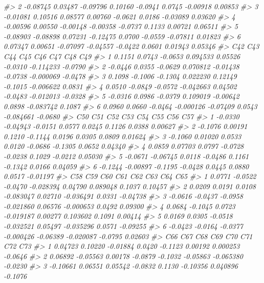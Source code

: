 \documentclass[]{book}
\newenvironment{Shaded}{\begin{snugshade}}{\end{snugshade}}
\newcommand{\CommentTok}[1]{\textcolor[rgb]{0.56,0.35,0.01}{\textit{#1}}}
\begin{document}
\begin{Shaded}
\begin{Highlighting}[]
{{{{{\CommentTok{#> 2 -0.08745  0.03487 -0.09796  0.10160 -0.0941  0.0745 -0.00918  0.00853}
\CommentTok{#> 3 -0.01081  0.10516  0.08577  0.00760 -0.0621  0.0186 -0.03089  0.03620}
\CommentTok{#> 4 -0.00596  0.00550 -0.00148 -0.00358 -0.0737  0.1133  0.00721  0.06511}
\CommentTok{#> 5 -0.08903 -0.08898  0.07231 -0.12475  0.0700 -0.0559 -0.07811  0.01823}
\CommentTok{#> 6  0.07347  0.00651 -0.07097 -0.04557 -0.0422  0.0601  0.01943  0.05346}
\CommentTok{#>       C42     C43     C44       C45      C46     C47       C48     C49}
\CommentTok{#> 1  0.1151  0.0743 -0.0653  0.094533  0.05526 -0.0310 -0.114233 -0.0790}
\CommentTok{#> 2 -0.0446  0.0355 -0.0629  0.070812 -0.01438 -0.0738 -0.000069 -0.0478}
\CommentTok{#> 3  0.1098 -0.1006 -0.1304  0.022230  0.12149 -0.1015 -0.006622  0.0831}
\CommentTok{#> 4  0.0510 -0.0849 -0.0572 -0.042663  0.04502 -0.0483 -0.012013 -0.0328}
\CommentTok{#> 5 -0.0316  0.0986 -0.0379  0.109019 -0.00642  0.0898 -0.083742  0.1087}
\CommentTok{#> 6  0.0960  0.0660 -0.0464 -0.000126 -0.07409  0.0543 -0.084661 -0.0680}
\CommentTok{#>       C50      C51     C52     C53     C54     C55     C56      C57}
\CommentTok{#> 1 -0.0330 -0.04943 -0.0151  0.0577  0.0245  0.1126  0.0388  0.00627}
\CommentTok{#> 2 -0.1076  0.00191  0.1210 -0.1144  0.0196  0.0305  0.0809  0.01624}
\CommentTok{#> 3 -0.1060  0.01020  0.0533  0.0120 -0.0686 -0.1305  0.0652  0.04340}
\CommentTok{#> 4  0.0859  0.07703  0.0797 -0.0728 -0.0238  0.1029 -0.0212  0.05030}
\CommentTok{#> 5 -0.0671 -0.06745  0.0118 -0.0486  0.1161 -0.1342  0.0166  0.04059}
\CommentTok{#> 6 -0.1244 -0.00897 -0.1195 -0.0428  0.0445  0.0880  0.0517 -0.01197}
\CommentTok{#>       C58     C59     C60       C61      C62       C63     C64      C65}
\CommentTok{#> 1  0.0771 -0.0522 -0.0470 -0.028394  0.04790  0.089048  0.1037  0.10457}
\CommentTok{#> 2  0.0209  0.0191  0.0108 -0.083047  0.02710 -0.036491  0.0331 -0.04738}
\CommentTok{#> 3 -0.0616 -0.0437 -0.0958 -0.021860  0.06576 -0.000653  0.0492  0.09300}
\CommentTok{#> 4  0.0684 -0.1045  0.0723 -0.019187  0.00277  0.103602  0.1091  0.00414}
\CommentTok{#> 5  0.0169  0.0305 -0.0518 -0.032521  0.05497 -0.035296  0.0571 -0.09255}
\CommentTok{#> 6 -0.0423 -0.0164 -0.0377 -0.000426 -0.06389 -0.020087 -0.0795  0.02603}
\CommentTok{#>        C66      C67      C68     C69     C70      C71       C72     C73}
\CommentTok{#> 1  0.04723  0.10220 -0.01884  0.0420 -0.1123  0.00192  0.000253 -0.0646}
\CommentTok{#> 2  0.06892 -0.05563  0.00178 -0.0879 -0.1032 -0.05863 -0.065380 -0.0230}
\CommentTok{#> 3 -0.10661  0.06551  0.05542 -0.0832  0.1130 -0.10356  0.040896 -0.1076}
}}}}}
\end{Highlighting}
\end{Shaded}
\end{document}
